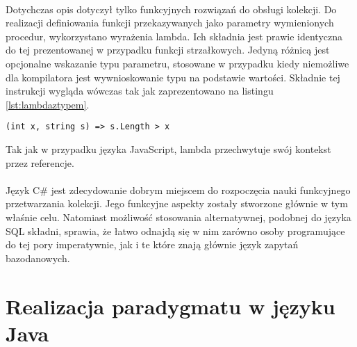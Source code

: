 \documentclass[a4paper,10pt]{report}
\begin{document}
\paragraph{}
Dotychczas opis dotyczył tylko funkcyjnych rozwiązań do obsługi kolekcji. Do realizacji definiowania funkcji przekazywanych jako parametry wymienionych procedur, wykorzystano wyrażenia lambda. Ich składnia jest prawie identyczna do tej prezentowanej w przypadku funkcji strzałkowych. Jedyną różnicą jest opcjonalne wskazanie typu parametru, stosowane w przypadku kiedy niemożliwe dla kompilatora jest wywnioskowanie typu na podstawie wartości. Składnie tej instrukcji wygląda wówczas tak jak zaprezentowano na listingu \ref{lst:lambdaztypem}.
\begin{lstlisting}[caption={Wyrażenie lambda z jawnym wskazaniem typu},style=sharpc,label={lst:lambdaztypem}]
(int x, string s) => s.Length > x 
\end{lstlisting}
Tak jak w przypadku języka JavaScript, lambda przechwytuje swój kontekst przez referencje.
\paragraph{}
Język C\# jest zdecydowanie dobrym miejscem do rozpoczęcia nauki funkcyjnego przetwarzania kolekcji. Jego funkcyjne aspekty zostały stworzone głównie w tym właśnie celu. Natomiast możliwość stosowania alternatywnej, podobnej do języka SQL składni, sprawia, że łatwo odnajdą się w nim zarówno osoby programujące do tej pory imperatywnie, jak i te które znają głównie język zapytań bazodanowych.
\section{Realizacja paradygmatu w języku Java}
\end{document}
